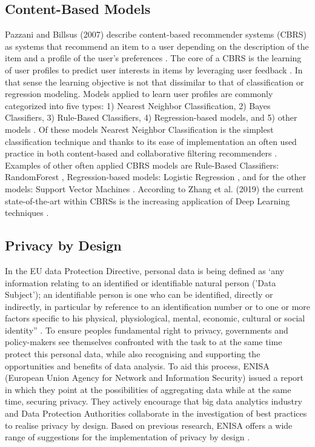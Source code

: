 \subsection{Content-Based Models}
\label{sec:cbm}
Pazzani and Billsus (2007) describe content-based recommender systems (CBRS) as systems that recommend an item to a user depending on the description of the item and a profile of the user’s preferences \cite{pazzani2007content}.
The core of a CBRS is the learning of user profiles to predict user interests in items by leveraging user feedback \cite{aggarwal2016content}.
In that sense the learning objective is not that dissimilar to that of classification or regression modeling.
Models applied to learn user profiles are commonly categorized into five types: 1) Nearest Neighbor Classification, 2) Bayes Classifiers, 3) Rule-Based Classifiers, 4) Regression-based models, and 5) other models \cite{aggarwal2016content, pazzani2007content}.
Of these models Nearest Neighbor Classification is the simplest classification technique and thanks to its ease of implementation an often used practice in both content-based and collaborative filtering recommenders \cite{balabanovic1997fab}.
Examples of other often applied CBRS models  are Rule-Based Classifiers: RandomForest  \cite{zhang2016three, breiman2001random}, Regression-based models: Logistic Regression \cite{aggarwal2016content, hosmer2013applied}, and for the other models: Support Vector Machines \cite{aggarwal2016content, burges1998tutorial}.
According to Zhang et al. (2019) the current state-of-the-art within CBRSs is the increasing application of Deep Learning techniques \cite{zhang2019deep}.

\subsection{Privacy by Design}
\label{sec:pbd}
In the EU data Protection Directive, personal data is being defined as ‘any information relating to an identified or identifiable natural person ('Data Subject'); an identifiable person is one who can be identified, directly or indirectly, in particular by reference to an identification number or to one or more factors specific to his physical, physiological, mental, economic, cultural or social identity” \cite{european_data_protection}. 
To ensure peoples fundamental right to privacy, governments and policy-makers see themselves confronted with the task to at the same time protect this personal data, while also recognising and supporting the opportunities and benefits of data analysis.
To aid this process, ENISA (European Union Agency for Network and Information Security) issued a report in which they point at the possibilities of aggregating data while at the same time, securing privacy. 
They actively encourage that big data analytics industry and Data Protection Authorities collaborate in the investigation of best practices to realise privacy by design. 
Based on previous research, ENISA offers a wide range of suggestions for the implementation of privacy by design \cite{d2015privacy}.

